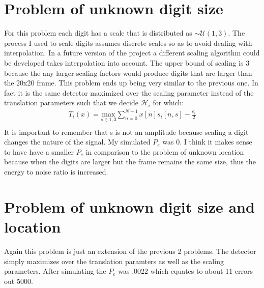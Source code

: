 \documentclass[12pt]{article}
\begin{document}
\section{Problem of unknown digit size}
	For this problem each digit has a scale that is distributed as $\sim\mathcal{U}(1,3)$.
	The process I used to scale digits assumes discrete scales so as to avoid dealing
		with interpolation.
	In a future version of the project a different scaling algorithm could be developed
		takes interpolation into account.
	The upper bound of scaling is 3 because the any larger scaling factors would produce
		digits that are larger than the 20x20 frame.
	This problem ends up being very similar to the previous one.
 	In fact it is the same detector maximized over the scaling parameter instead of the
		translation parameters such that we decide $\mathcal{H}_i$ for which:
	\begin{gather*}
		T_i(x) = \underset{s \in 1,3}{\text{max}}\sum_{n=0}^{N-1} 
		x[n]s_i[n,s] - \frac{\epsilon_i}{2} \\
	\end{gather*}
	It is important to remember that s is not an amplitude because scaling a digit
		changes the nature of the signal.
	My simulated $P_e$ was 0.
	I think it makes sense to have have a smaller $P_e$ in comparison to the problem of 
		unknown location because when the digits are larger but the frame remains the same
		size, thus the energy to noise ratio is increased.
\section{Problem of unknown digit size and location}
	Again this problem is just an extension of the previous 2 problems.
	The detector simply maximizes over the translation paramters as well as the scaling
		parameters.
	After simulating the $P_e$ was .0022 which equates to about 11 errors out 5000.
\end{document}
